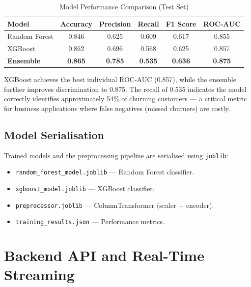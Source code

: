 \documentclass[12pt, a4paper]{report}
\begin{document}
\begin{table}[H]
\centering
\caption{Model Performance Comparison (Test Set)}
\label{tab:results}
\begin{tabular}{l c c c c c}
\toprule
\textbf{Model} & \textbf{Accuracy} & \textbf{Precision} & \textbf{Recall} & \textbf{F1 Score} & \textbf{ROC-AUC} \\
\midrule
Random Forest & 0.846 & 0.625 & 0.609 & 0.617 & 0.855 \\
XGBoost & 0.862 & 0.696 & 0.568 & 0.625 & 0.857 \\
\textbf{Ensemble} & \textbf{0.865} & \textbf{0.785} & \textbf{0.535} & \textbf{0.636} & \textbf{0.875} \\
\bottomrule
\end{tabular}
\end{table}

\noindent XGBoost achieves the best individual ROC-AUC (0.857), while the ensemble further improves discrimination to 0.875. The recall of 0.535 indicates the model correctly identifies approximately 54\% of churning customers --- a critical metric for business applications where false negatives (missed churners) are costly.

\section{Model Serialisation}

Trained models and the preprocessing pipeline are serialised using \texttt{joblib}:
\begin{itemize}
    \item \texttt{random\_forest\_model.joblib} --- Random Forest classifier.
    \item \texttt{xgboost\_model.joblib} --- XGBoost classifier.
    \item \texttt{preprocessor.joblib} --- ColumnTransformer (scaler + encoder).
    \item \texttt{training\_results.json} --- Performance metrics.
\end{itemize}


\chapter{Backend API and Real-Time Streaming}
\end{document}
